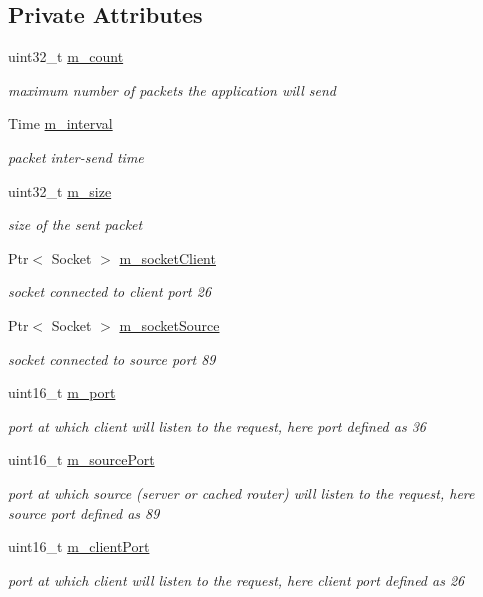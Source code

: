 \subsection*{Private Attributes}
\begin{DoxyCompactItemize}
\item 
uint32\-\_\-t \hyperlink{classns3_1_1IcnManager_a43c8815cc7e2746f7c96e8e847ee6c03}{m\-\_\-count}
\begin{DoxyCompactList}\small\item\em maximum number of packets the application will send \end{DoxyCompactList}\item 
Time \hyperlink{classns3_1_1IcnManager_a4064521e1b0c672c5cf34ae49a7a97c7}{m\-\_\-interval}
\begin{DoxyCompactList}\small\item\em packet inter-\/send time \end{DoxyCompactList}\item 
uint32\-\_\-t \hyperlink{classns3_1_1IcnManager_a5b544ba6282f0ac718ae203380ed5f3a}{m\-\_\-size}
\begin{DoxyCompactList}\small\item\em size of the sent packet \end{DoxyCompactList}\item 
Ptr$<$ Socket $>$ \hyperlink{classns3_1_1IcnManager_a24764426c0a4f06ccfc560cf333641b9}{m\-\_\-socket\-Client}
\begin{DoxyCompactList}\small\item\em socket connected to client port 26 \end{DoxyCompactList}\item 
Ptr$<$ Socket $>$ \hyperlink{classns3_1_1IcnManager_a6ed2472d0ef144df7ae0349c7faefc12}{m\-\_\-socket\-Source}
\begin{DoxyCompactList}\small\item\em socket connected to source port 89 \end{DoxyCompactList}\item 
uint16\-\_\-t \hyperlink{classns3_1_1IcnManager_a02128bc30bd364361da442f6bd799c4b}{m\-\_\-port}
\begin{DoxyCompactList}\small\item\em port at which client will listen to the request, here port defined as 36 \end{DoxyCompactList}\item 
uint16\-\_\-t \hyperlink{classns3_1_1IcnManager_a93399455541c4a44cf75cbbbc0b5c56d}{m\-\_\-source\-Port}
\begin{DoxyCompactList}\small\item\em port at which source (server or cached router) will listen to the request, here source port defined as 89 \end{DoxyCompactList}\item 
uint16\-\_\-t \hyperlink{classns3_1_1IcnManager_a704ea4271e14eb01e05318496c2b5d72}{m\-\_\-client\-Port}
\begin{DoxyCompactList}\small\item\em port at which client will listen to the request, here client port defined as 26 \end{DoxyCompactList}\end{DoxyCompactItemize}

